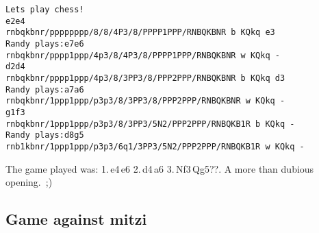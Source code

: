 \documentclass [12pt ,a4paper, english]{scrartcl}
\theoremstyle{plain}
\theoremstyle{definition}
\theoremstyle{remark}
\begin{document}
\begin{lstlisting}
Lets play chess!
e2e4
rnbqkbnr/pppppppp/8/8/4P3/8/PPPP1PPP/RNBQKBNR b KQkq e3
Randy plays:e7e6
rnbqkbnr/pppp1ppp/4p3/8/4P3/8/PPPP1PPP/RNBQKBNR w KQkq -
d2d4
rnbqkbnr/pppp1ppp/4p3/8/3PP3/8/PPP2PPP/RNBQKBNR b KQkq d3
Randy plays:a7a6
rnbqkbnr/1ppp1ppp/p3p3/8/3PP3/8/PPP2PPP/RNBQKBNR w KQkq -
g1f3
rnbqkbnr/1ppp1ppp/p3p3/8/3PP3/5N2/PPP2PPP/RNBQKB1R b KQkq -
Randy plays:d8g5
rnb1kbnr/1ppp1ppp/p3p3/6q1/3PP3/5N2/PPP2PPP/RNBQKB1R w KQkq -
\end{lstlisting}
The game played was: 1.\,e4\,e6 2.\,d4\,a6 3.\,Nf3\,Qg5??. A more than dubious opening.~;)

\subsection{Game against mitzi}
\end{document}
